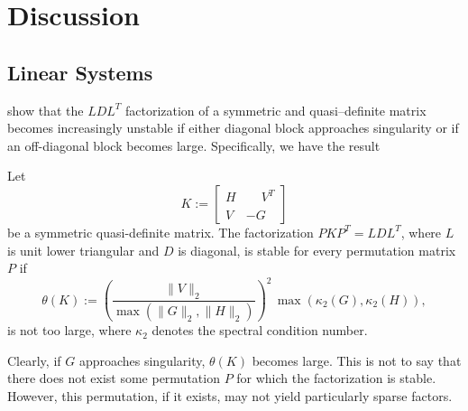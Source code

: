 \documentclass{amsart}
\begin{document}
\section{Discussion}
\label{sec:discussion}

\subsection{Linear Systems}

\cite{gill-saunders-shinnerl-1996} show that the $LDL^T$ factorization of a
symmetric and quasi--definite matrix becomes increasingly unstable if either
diagonal block approaches singularity or if an off-diagonal block becomes
large. Specifically, we have the result
\begin{btheorem}
  \label{thm:gss}
  Let
  \[
    K :=
    \begin{bmatrix}
      H & \phantom{-}V^T \\
      V & -G^{\phantom{T}}
    \end{bmatrix}
  \]
  be a symmetric quasi-definite matrix. The factorization $P K P^T = L D L^T$,
  where $L$ is unit lower triangular and $D$ is diagonal, is stable for every
  permutation matrix $P$ if
  \[
    \theta(K) :=
    \left(
      \frac{\|V\|_2}{\max(\|G\|_2, \|H\|_2)}
    \right)^2
    \,
    \max( \kappa_2(G), \kappa_2(H) ),
  \]
  is not too large, where $\kappa_2$ denotes the spectral condition number.
\end{btheorem}
Clearly, if $G$ approaches singularity, $\theta(K)$ becomes large. This is not
to say that there does not exist some permutation $P$ for which the
factorization is stable. However, this permutation, if it exists, may not yield
particularly sparse factors.
\end{document}
